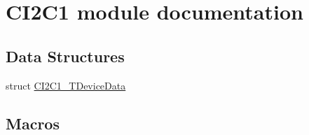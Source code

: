 \hypertarget{group___c_i2_c1__module}{\section{C\-I2\-C1 module documentation}
\label{group___c_i2_c1__module}
}
\subsection*{Data Structures}
\begin{DoxyCompactItemize}
\item 
struct \hyperlink{struct_c_i2_c1___t_device_data}{C\-I2\-C1\-\_\-\-T\-Device\-Data}
\end{DoxyCompactItemize}
\subsection*{Macros}
